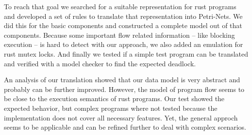 To reach that goal we searched for a suitable representation for rust programs and developed a set of rules to translate that representation into Petri-Nets.
We did this for the basic components and constructed a complete model out of that components.
Because some important flow related information -- like blocking execution -- is hard to detect with our approach, we also added an emulation for rust mutex locks.
And finally we tested if a simple test program can be translated and verified with a model checker to find the expected deadlock.

An analysis of our translation showed that our data model is very abstract and probably can be further improved.
However, the model of program flow seems to be close to the execution semantics of rust programs.
Our test showed the expected behavior, but complex programs where not tested because the implementation does not cover all necessary features.
Yet, the general approch seems to be applicable and can be refined further to deal with complex scenarios.
